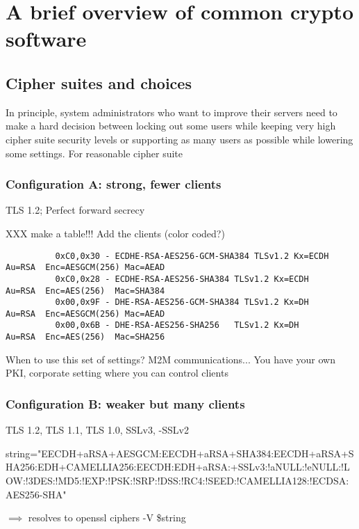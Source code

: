\section{A brief overview of common crypto software}


\subsection{Cipher suites and choices}

In principle, system administrators who want to improve their servers need to make a hard decision between locking out some users while keeping very high cipher suite security levels or supporting as many users as possible while lowering some settings. 
For reasonable cipher suite


\subsubsection{Configuration A: strong, fewer clients}
TLS 1.2; 
Perfect forward secrecy

XXX make a table!!! Add the clients (color coded?)
\begin{verbatim}
          0xC0,0x30 - ECDHE-RSA-AES256-GCM-SHA384 TLSv1.2 Kx=ECDH     Au=RSA  Enc=AESGCM(256) Mac=AEAD
          0xC0,0x28 - ECDHE-RSA-AES256-SHA384 TLSv1.2 Kx=ECDH     Au=RSA  Enc=AES(256)  Mac=SHA384
          0x00,0x9F - DHE-RSA-AES256-GCM-SHA384 TLSv1.2 Kx=DH       Au=RSA  Enc=AESGCM(256) Mac=AEAD
          0x00,0x6B - DHE-RSA-AES256-SHA256   TLSv1.2 Kx=DH       Au=RSA  Enc=AES(256)  Mac=SHA256
\end{verbatim}

When to use this set of settings?
M2M communications... You have your own PKI, corporate setting where you can control clients


\subsubsection{Configuration B: weaker but many clients}

TLS 1.2, TLS 1.1, TLS 1.0, SSLv3, -SSLv2

string="EECDH+aRSA+AESGCM:EECDH+aRSA+SHA384:EECDH+aRSA+SHA256:EDH+CAMELLIA256:EECDH:EDH+aRSA:+SSLv3:!aNULL:!eNULL:!LOW:!3DES:!MD5:!EXP:!PSK:!SRP:!DSS:!RC4:!SEED:!CAMELLIA128:!ECDSA:AES256-SHA"

$\implies$ resolves to openssl ciphers -V \$string


